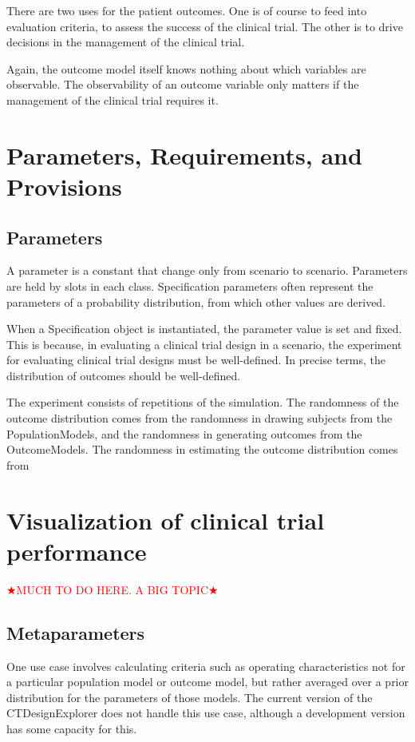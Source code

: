 \documentclass[12pt]{amsart}
\def\comment<#1>{\textcolor{red}{$\bigstar$#1$\bigstar$}}
\begin{document}
There are two uses for the patient outcomes.  One is of course to feed into
evaluation criteria, to assess the success of the clinical trial. The other is to 
drive decisions in the management of the clinical trial.

Again, the outcome model itself knows nothing about which variables 
are observable. The observability of an outcome variable only matters   
if the management of the clinical trial requires it.



\section{Parameters, Requirements, and Provisions}


\subsection{Parameters }
A parameter is a constant that change only from scenario to scenario.  
Parameters are held by slots in each class.
Specification parameters often represent the parameters of a probability distribution,
from which other values are derived.

When a Specification object is instantiated, the parameter value is set and fixed.
This is because, in evaluating a clinical trial design in a scenario, 
the experiment for evaluating clinical trial designs must be well-defined.
In precise terms, the distribution of
outcomes should be well-defined.

The experiment consists of repetitions of the simulation.
The randomness of the outcome distribution comes from the randomness
in drawing subjects from the PopulationModels, and the randomness in generating outcomes
from the OutcomeModels.
The randomness in estimating the outcome distribution comes from

\section{Visualization of clinical trial performance}

\comment<MUCH TO DO HERE. A BIG TOPIC>


\subsection{Metaparameters}

One use case involves calculating criteria such as operating characteristics not for a particular population model or outcome model, but rather averaged over a prior distribution for the parameters of those models. The current version of the CTDesignExplorer does not handle this use case, although a development version has some capacity for this.
\end{document}
